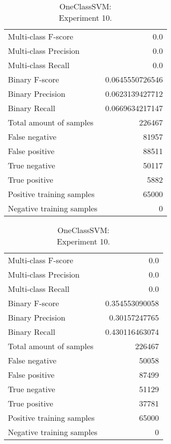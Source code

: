 \begin{table}[H]
\begin{minipage}{0.5\textwidth}
\caption{OneClassSVM: \\Experiment 9.}

\centering
\begin{tabular}{l r}
\toprule
Multi-class F-score & 0.0 \\
Multi-class Precision & 0.0 \\
Multi-class Recall & 0.0 \\
\midrule
Binary F-score & 0.0645550726546 \\
Binary Precision & 0.0623139427712 \\
Binary Recall & 0.0669634217147 \\
\midrule
Total amount of samples & 226467 \\

False negative & 81957 \\
False positive & 88511 \\
True negative & 50117 \\
True positive & 5882 \\
\midrule
Positive training samples & 65000 \\
Negative training samples & 0 \\
\bottomrule
\end{tabular}

\end{minipage}
\hfillx
\begin{minipage}{0.5\textwidth}
\caption{OneClassSVM: \\Experiment 10.}

\centering
\begin{tabular}{l r}
\toprule
Multi-class F-score & 0.0 \\
Multi-class Precision & 0.0 \\
Multi-class Recall & 0.0 \\
\midrule
Binary F-score & 0.354553090058 \\
Binary Precision & 0.30157247765 \\
Binary Recall & 0.430116463074 \\
\midrule
Total amount of samples & 226467 \\

False negative & 50058 \\
False positive & 87499 \\
True negative & 51129 \\
True positive & 37781 \\
\midrule
Positive training samples & 65000 \\
Negative training samples & 0 \\
\bottomrule
\end{tabular}
\end{minipage}
\end{table}

